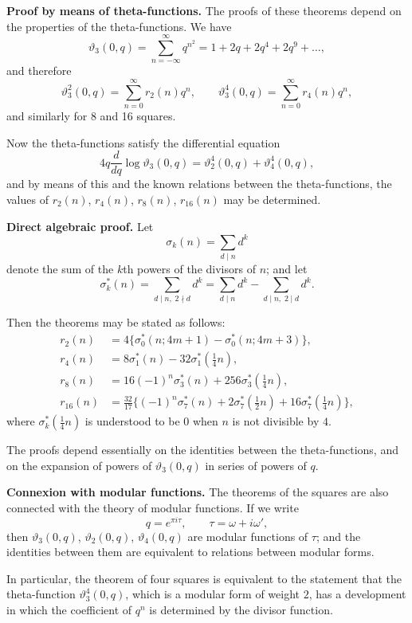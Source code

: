 \documentclass[12pt,a4paper]{article}
\begin{document}
\textbf{Proof by means of theta-functions.} The proofs of these theorems depend
on the properties of the theta-functions. We have
%
\[
\vartheta_3(0, q) = \sum_{n=-\infty}^{\infty} q^{n^2}
= 1 + 2q + 2q^4 + 2q^9 + \ldots,
\]
and therefore
%
\[
\vartheta_3^2(0, q) = \sum_{n=0}^{\infty} r_2(n) q^n,
\qquad
\vartheta_3^4(0, q) = \sum_{n=0}^{\infty} r_4(n) q^n,
\]
%
and similarly for 8 and 16 squares.

Now the theta-functions satisfy the differential equation
%
\[
4q \frac{d}{dq} \log \vartheta_3(0, q)
= \vartheta_2^4(0, q) + \vartheta_4^4(0, q),
\]
%
and by means of this and the known relations between the theta-functions,
the values of $r_2(n)$, $r_4(n)$, $r_8(n)$, $r_{16}(n)$ may be determined.

\textbf{Direct algebraic proof.} Let
%
\[
\sigma_k(n) = \sum_{d \mid n} d^k
\]
%
denote the sum of the $k$th powers of the divisors of $n$; and let
%
\[
\sigma_k^*(n) = \sum_{d \mid n,\; 2 \nmid d} d^k
= \sum_{d \mid n} d^k - \sum_{d \mid n,\; 2 \mid d} d^k.
\]

Then the theorems may be stated as follows:
\begin{align*}
r_2(n) &= 4\{\sigma_0^*(n; 4m+1) - \sigma_0^*(n; 4m+3)\}, \\
r_4(n) &= 8\sigma_1^*(n) - 32\sigma_1^*(\tfrac{1}{4}n), \\
r_8(n) &= 16(-1)^n \sigma_3^*(n) + 256\sigma_3^*(\tfrac{1}{4}n), \\
r_{16}(n) &= \tfrac{32}{17} \{(-1)^n \sigma_7^*(n) + 2\sigma_7^*(\tfrac{1}{2}n)
+ 16\sigma_7^*(\tfrac{1}{4}n)\},
\end{align*}
where $\sigma_k^*(\tfrac{1}{4}n)$ is understood to be $0$ when $n$ is not divisible by $4$.

The proofs depend essentially on the identities between the theta-functions,
and on the expansion of powers of $\vartheta_3(0, q)$ in series of powers of $q$.

\textbf{Connexion with modular functions.} The theorems of the squares are also
connected with the theory of modular functions. If we write
%
\[
q = e^{\pi i \tau}, \qquad \tau = \omega + i\omega',
\]
%
then $\vartheta_3(0, q)$, $\vartheta_2(0, q)$, $\vartheta_4(0, q)$ are modular functions of $\tau$; and the
identities between them are equivalent to relations between modular forms.

In particular, the theorem of four squares is equivalent to the statement
that the theta-function $\vartheta_3^4(0, q)$, which is a modular form of weight $2$, has
a development in which the coefficient of $q^n$ is determined by the divisor
function.
\end{document}
